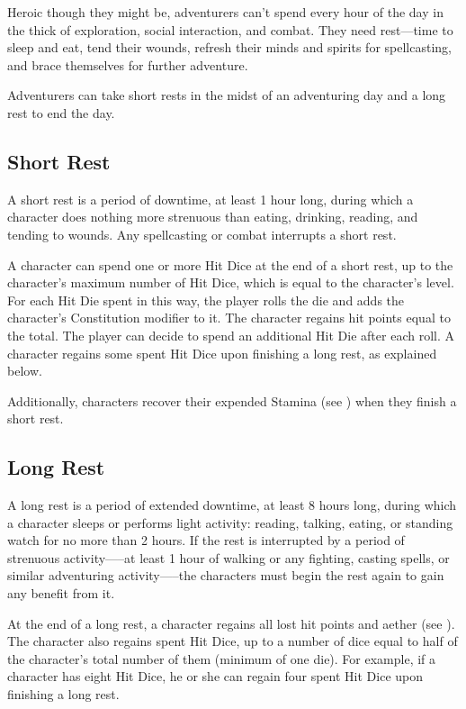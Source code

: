 Heroic though they might be, adventurers can't spend every hour of the day in the thick of exploration, social interaction, and combat. They need rest---time to sleep and eat, tend their wounds, refresh their minds and spirits for spellcasting, and brace themselves for further adventure.

Adventurers can take short rests in the midst of an adventuring day and a long rest to end the day.

\subsection{Short Rest}

A short rest is a period of downtime, at least 1 hour long, during which a character does nothing more strenuous than eating, drinking, reading, and tending to wounds. Any spellcasting or combat interrupts a short rest.

A character can spend one or more Hit Dice at the end of a short rest, up to the character's maximum number of Hit Dice, which is equal to the character's level. For each Hit Die spent in this way, the player rolls the die and adds the character's Constitution modifier to it. The character regains hit points equal to the total. The player can decide to spend an additional Hit Die after each roll. A character regains some spent Hit Dice upon finishing a long rest, as explained below.

Additionally, characters recover their expended Stamina (see ) when they finish a short rest.

\subsection{Long Rest}

A long rest is a period of extended downtime, at least 8 hours long, during which a character sleeps or performs light activity: reading, talking, eating, or standing watch for no more than 2 hours. If the rest is interrupted by a period of strenuous activity—--at least 1 hour of walking or any fighting, casting spells, or similar adventuring activity—--the characters must begin the rest again to gain any benefit from it.

At the end of a long rest, a character regains all lost hit points and aether (see ). The character also regains spent Hit Dice, up to a number of dice equal to half of the character's total number of them (minimum of one die). For example, if a character has eight Hit Dice, he or she can regain four spent Hit Dice upon finishing a long rest.

